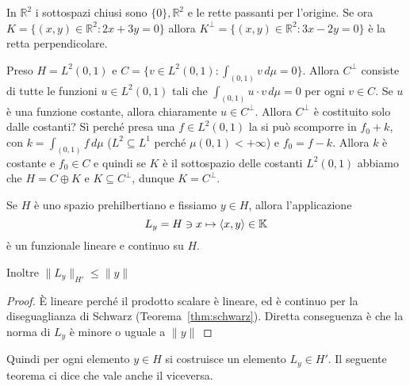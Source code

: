 \begin{example}
    In \(\mathbb{R}^2\) i sottospazi chiusi sono \(\{0\} , \mathbb{R}^2\) e le
    rette passanti per l'origine. Se ora \(K = \{{(x, y)} \in \mathbb{R}^2 : 2x
        + 3y = 0\}\) allora \(K^\perp = \{{(x, y)} \in \mathbb{R}^2 : 3x - 2y =
        0\}\) è la retta perpendicolare.
\end{example}

\begin{example}
    Preso \(H = L^2{(0, 1)}\) e \(C = \{v \in L^2{(0, 1)}: \int _{{(0,1)}} v \,d
    \mu = 0\} \). Allora \(C^\perp \) consiste di tutte le funzioni \(u \in
    L^2{(0, 1)}\) tali che \(\int _{{(0,1)}} u \cdot v \,d \mu = 0 \) per ogni
    \(v \in C\). Se \(u\) è una funzione costante, allora chiaramente \(u \in
    C^\perp \). Allora \(C^\perp \) è costituito solo dalle costanti? Sì perché
    presa una \(f \in L^2{(0, 1)}\) la si può scomporre in \(f_{0} + k\), con
    \(k = \int _{{(0,1)}} f \,d \mu\) (\(L^2 \subseteq L^{1}\) perché
    \(\mu{(0,1)} < +\infty\)) e \(f_{0} = f - k\). Allora \(k\) è
    costante e \(f_{0} \in C\) e quindi se \(K\) è il sottospazio delle costanti
    \( L^2{(0,1)}\) abbiamo che \(H = C \oplus K\) e \(K \subseteq C^\perp  \),
    dunque \(K = C^\perp\).
\end{example}

\begin{lemma}
    Se \(H\) è uno spazio prehilbertiano e fissiamo \(y \in H\), allora
    l'applicazione
    \[
        L_y = H \ni x \mapsto {\left\langle x, y\right\rangle} \in \mathbb{K}
    \]
    è un funzionale lineare e continuo su \(H\).

    Inoltre \(\|L_y\|_{H'} \le \|y\|\) 
\end{lemma}
\begin{proof}
    È lineare perché il prodotto scalare è lineare, ed è continuo per la
    diseguaglianza di Schwarz (Teorema~\ref{thm:schwarz}). Diretta conseguenza è
    che la norma di \(L_y\) è minore o uguale a \(\|y\|\)
\end{proof}

Quindi per ogni elemento \(y \in H\) si costruisce un elemento \(L_y \in H'\).
Il seguente teorema ci dice che vale anche il viceversa.


